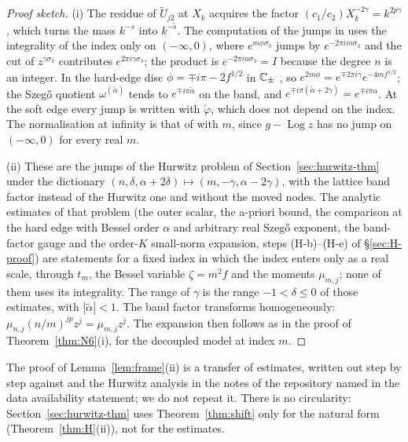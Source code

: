 \begin{proof}[Proof sketch]
(i) The residue of $\tilde U_{j2}$ at $X_k$ acquires the factor $(c_1/c_2)X_k^{-2\gamma}=k^{2p\gamma}$, which turns the mass $k^{-s}$ into
$k^{-\tilde s}$. The computation of the jumps in \cite[Section~5]{PaperII} uses the integrality of the index only on $(-\infty,0)$,
where $e^{m\phi\sigma_3}$ jumps by $e^{-2\pi im\sigma_3}$ and the cut of $z^{\gamma\sigma_3}$ contributes $e^{2\pi i\gamma\sigma_3}$; the
product is $e^{-2\pi in\sigma_3}=I$ because the degree $n$ is an integer. In the hard-edge disc $\phi=\mp i\pi-2f^{1/2}$ in $\mathbb{C}_\pm$
\cite{PaperII}, so $e^{2m\phi}=e^{\mp2\pi i\gamma}e^{-4m f^{1/2}}$; the Szeg\H{o} quotient $\omega^{(\tilde\alpha)}$ tends to
$e^{\mp i\pi\tilde\alpha}$ on the band, and $e^{\mp i\pi(\tilde\alpha+2\gamma)}=e^{\mp i\pi\alpha}$. At the soft edge every jump is written
with $\tilde\varphi$, which does not depend on the index. The normalisation at infinity is that of \cite{PaperII} with $m$, since
$g-\operatorname{Log}z$ has no jump on $(-\infty,0)$ for every real $m$.

(ii) These are the jumps of the Hurwitz problem of Section~\ref{sec:hurwitz-thm} under the dictionary
$(n,\delta,\alpha+2\delta)\mapsto(m,-\gamma,\alpha-2\gamma)$, with the lattice band factor instead of the Hurwitz one and without the
moved nodes. The analytic estimates of that problem (the outer scalar, the a-priori bound, the comparison at the hard edge with
Bessel order $\alpha$ and arbitrary real Szeg\H{o} exponent, the band-factor gauge and the order-$K$ small-norm expansion, steps
(H-b)--(H-e) of \S\ref{sec:H-proof}) are statements for a fixed index in which the index enters only as a real scale, through
$t_m$, the Bessel variable $\zeta=m^2f$ and the moments $\mu_{m,j}$; none of them uses its integrality. The range of $\gamma$ is the
range $-1<\delta\le0$ of those estimates, with $|\tilde\alpha|<1$. The band factor transforms homogeneously:
$\mu_{n,j}(n/m)^{jp}z^j=\mu_{m,j}z^j$. The expansion then follows as in the proof of Theorem~\ref{thm:N6}(i), for the decoupled model at index $m$.
\end{proof}

The proof of Lemma~\ref{lem:frame}(ii) is a transfer of estimates, written out step by step against \cite{PaperII} and the
Hurwitz analysis in the notes of the repository named in the data availability statement; we do not repeat it. There is no
circularity: Section~\ref{sec:hurwitz-thm} uses Theorem~\ref{thm:shift} only for the natural form (Theorem~\ref{thm:H}(ii)), not
for the estimates.

